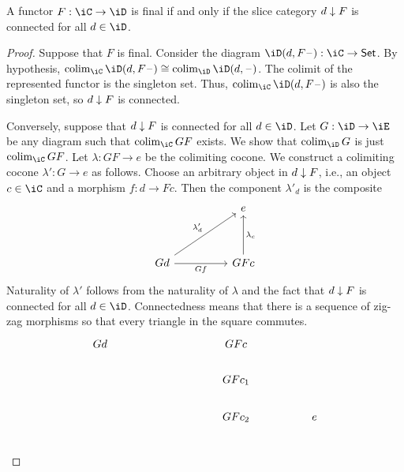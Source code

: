 \documentclass{zett}
\begin{document}
\begin{lem}\label{lem:final-slice-connected}
  A functor $F : \iC \to \iD$ is final if and only if the slice category $d \downarrow F$ is connected for all $d \in \iD$.
\end{lem}
\begin{proof}
  Suppose that $F$ is final.
  Consider the diagram $\iD(d, F\blank) : \iC \to \CSet$.
  By hypothesis, $\colim_{\iC}\iD(d, F\blank) \iso \colim_{\iD}\iD(d, \blank)$.
  The colimit of the represented functor is the singleton set.
  Thus, $\colim_{\iC}\iD(d, F\blank)$ is also the singleton set, so $d \downarrow F$ is connected.

  Conversely, suppose that $d \downarrow F$ is connected for all $d \in \iD$.
  Let $G : \iD \to \iE$ be any diagram such that $\colim_{\iC}GF$ exists.
  We show that $\colim_{\iD}G$ is just $\colim_{\iC}GF$.
  Let $\lambda : GF \to e$ be the colimiting cocone.
  We construct a colimiting cocone $\lambda' : G \to e$ as follows.
  Choose an arbitrary object in $d \downarrow F$, i.e., an object $c \in \iC$ and a morphism $f : d \to Fc$.
  Then the component $\lambda'_{d}$ is the composite
  \[
    \begin{tikzcd}
      && e \\
      \\
      Gd && GFc
      \arrow["Gf"', from=3-1, to=3-3]
      \arrow["{\lambda_{c}}"', from=3-3, to=1-3]
      \arrow["{\lambda'_{d}}", from=3-1, to=1-3]
    \end{tikzcd}
  \]
  Naturality of $\lambda'$ follows from the naturality of $\lambda$ and the fact that $d \downarrow F$ is connected for all $d \in \iD$.
  Connectedness means that there is a sequence of zig-zag morphisms so that every triangle in the square commutes.
  \[
    \begin{tikzcd}
      Gd &&&& GFc \\
      &&&& {GFc_{1}} \\
      &&&& {GFc_{2}} && e \\

\end{tikzcd}\]
\end{proof}
\end{document}
